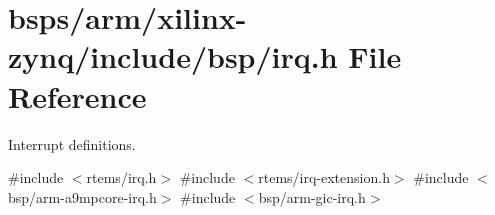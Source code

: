 \hypertarget{bsps_2arm_2xilinx-zynq_2include_2bsp_2irq_8h}{}\section{bsps/arm/xilinx-\/zynq/include/bsp/irq.h File Reference}
\label{bsps_2arm_2xilinx-zynq_2include_2bsp_2irq_8h}


Interrupt definitions.  


{\ttfamily \#include $<$rtems/irq.\+h$>$}\newline
{\ttfamily \#include $<$rtems/irq-\/extension.\+h$>$}\newline
{\ttfamily \#include $<$bsp/arm-\/a9mpcore-\/irq.\+h$>$}\newline
{\ttfamily \#include $<$bsp/arm-\/gic-\/irq.\+h$>$}\newline
